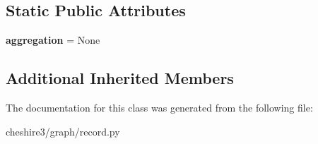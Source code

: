 \subsection*{Static Public Attributes}
\begin{DoxyCompactItemize}
\item 
\hypertarget{classcheshire3_1_1graph_1_1record_1_1_ore_graph_record_ad9127ee3aa79a570580aa9cb679894e4}{{\bfseries aggregation} = None}\label{classcheshire3_1_1graph_1_1record_1_1_ore_graph_record_ad9127ee3aa79a570580aa9cb679894e4}

\end{DoxyCompactItemize}
\subsection*{Additional Inherited Members}


The documentation for this class was generated from the following file\-:\begin{DoxyCompactItemize}
\item 
cheshire3/graph/record.\-py\end{DoxyCompactItemize}
